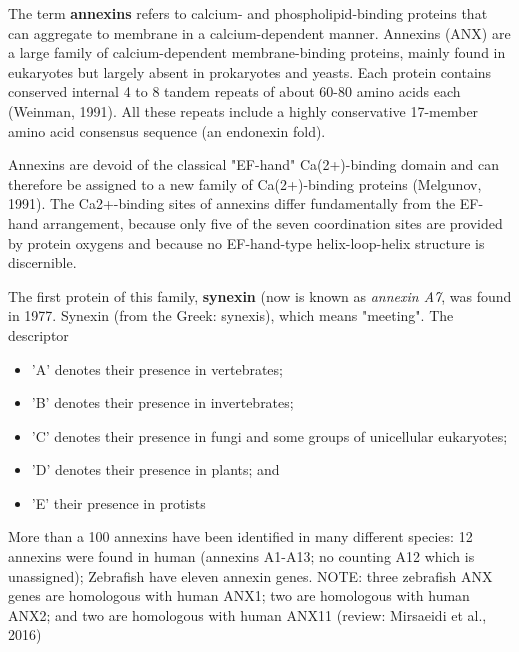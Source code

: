 The term {\bf annexins} refers to calcium- and phospholipid-binding proteins
that can aggregate to membrane in a calcium-dependent manner.
Annexins (ANX) are a large family of calcium-dependent membrane-binding
proteins, mainly found in  eukaryotes but largely absent in prokaryotes and
yeasts. Each protein contains conserved internal 4 to 8 tandem repeats of about
60-80 amino acids each (Weinman, 1991). All these repeats include a highly
conservative 17-member amino acid consensus sequence (an endonexin fold).

\begin{mdframed}
Annexins are devoid of the classical "EF-hand" Ca(2+)-binding domain and can
therefore be assigned to a new family of Ca(2+)-binding proteins (Melgunov,
1991). The Ca2+-binding sites of annexins differ fundamentally from the EF-hand
arrangement, because only five of the seven coordination sites are provided by
protein oxygens and because no EF-hand-type helix-loop-helix structure is discernible. 

\end{mdframed}


The first protein of this family, {\bf synexin} (now is known as {\it annexin
A7}, was found in 1977. Synexin (from the Greek: synexis), which means
"meeting". The descriptor 
\begin{itemize}
  \item  'A' denotes their presence in vertebrates; 
  
  \item 'B' denotes  their presence in invertebrates; 
  
  \item 'C' denotes their presence in fungi and some groups of unicellular
  eukaryotes; 
  
  \item 'D' denotes their presence in plants; and 
  
  \item 'E' their presence in protists   
\end{itemize}

More than a 100 annexins have been identified in many different species: 12
annexins were found in human (annexins A1-A13; no counting A12 which is
unassigned);  Zebrafish have eleven annexin genes. NOTE: three zebrafish ANX
genes are homologous with human ANX1; two are homologous with human ANX2; and
two are homologous with human ANX11  (review: Mirsaeidi et al., 2016)

